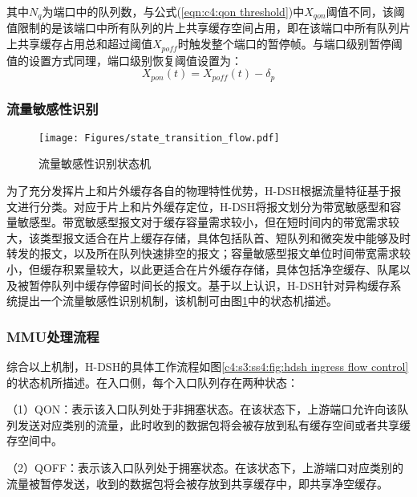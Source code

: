 \noindent 其中$N_q$为端口中的队列数，与公式(\ref{eqn:c4:qon threshold})中$X_{qon}$阈值不同，该阈值限制的是该端口中所有队列的片上共享缓存空间占用，即在该端口中所有队列片上共享缓存占用总和超过阈值$X_{poff}$时触发整个端口的暂停帧。与端口级别暂停阈值的设置方式同理，端口级别恢复阈值设置为：
\begin{equation}
  X_{pon}(t) = X_{poff}(t) - \delta_p
  \label{eqn:c4:pon threshold}
\end{equation}


\subsubsection{流量敏感性识别}

\begin{figure}[H]
  \centering
  \texttt{[image: Figures/state\_transition\_flow.pdf]}
  \caption{流量敏感性识别状态机}
  \label{c4:s1:ss1:fig:flow state transition}
\end{figure}

为了充分发挥片上和片外缓存各自的物理特性优势，H-DSH根据流量特征基于报文进行分类。对应于片上和片外缓存定位，H-DSH将报文划分为带宽敏感型和容量敏感型。带宽敏感型报文对于缓存容量需求较小，但在短时间内的带宽需求较大，该类型报文适合在片上缓存存储，具体包括队首、短队列和微突发中能够及时转发的报文，以及所在队列快速排空的报文；容量敏感型报文单位时间带宽需求较小，但缓存积累量较大，以此更适合在片外缓存存储，具体包括净空缓存、队尾以及被暂停队列中缓存停留时间长的报文。基于以上认识，H-DSH针对异构缓存系统提出一个流量敏感性识别机制，该机制可由图\ref{c4:s1:ss1:fig:flow state transition}中的状态机描述。


\subsubsection{MMU处理流程}

综合以上机制，H-DSH的具体工作流程如图\ref{c4:s3:ss4:fig:hdsh ingress flow control}的状态机所描述。在入口侧，每个入口队列存在两种状态：

（1）QON：表示该入口队列处于非拥塞状态。在该状态下，上游端口允许向该队列发送对应类别的流量，此时收到的数据包将会被存放到私有缓存空间或者共享缓存空间中。

（2）QOFF：表示该入口队列处于拥塞状态。在该状态下，上游端口对应类别的流量被暂停发送，收到的数据包将会被存放到共享缓存中，即共享净空缓存。

